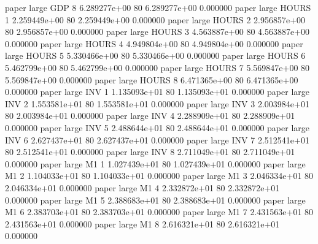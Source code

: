               paper      large      GDP                 8 6.289277e+00 80   6.289277e+00           0.000000
              paper      large    HOURS                 1 2.259449e+00 80   2.259449e+00           0.000000
              paper      large    HOURS                 2 2.956857e+00 80   2.956857e+00           0.000000
              paper      large    HOURS                 3 4.563887e+00 80   4.563887e+00           0.000000
              paper      large    HOURS                 4 4.949804e+00 80   4.949804e+00           0.000000
              paper      large    HOURS                 5 5.330466e+00 80   5.330466e+00           0.000000
              paper      large    HOURS                 6 5.462799e+00 80   5.462799e+00           0.000000
              paper      large    HOURS                 7 5.569847e+00 80   5.569847e+00           0.000000
              paper      large    HOURS                 8 6.471365e+00 80   6.471365e+00           0.000000
              paper      large      INV                 1 1.135093e+01 80   1.135093e+01           0.000000
              paper      large      INV                 2 1.553581e+01 80   1.553581e+01           0.000000
              paper      large      INV                 3 2.003984e+01 80   2.003984e+01           0.000000
              paper      large      INV                 4 2.288909e+01 80   2.288909e+01           0.000000
              paper      large      INV                 5 2.488644e+01 80   2.488644e+01           0.000000
              paper      large      INV                 6 2.627437e+01 80   2.627437e+01           0.000000
              paper      large      INV                 7 2.512541e+01 80   2.512541e+01           0.000000
              paper      large      INV                 8 2.711049e+01 80   2.711049e+01           0.000000
              paper      large       M1                 1 1.027439e+01 80   1.027439e+01           0.000000
              paper      large       M1                 2 1.104033e+01 80   1.104033e+01           0.000000
              paper      large       M1                 3 2.046334e+01 80   2.046334e+01           0.000000
              paper      large       M1                 4 2.332872e+01 80   2.332872e+01           0.000000
              paper      large       M1                 5 2.388683e+01 80   2.388683e+01           0.000000
              paper      large       M1                 6 2.383703e+01 80   2.383703e+01           0.000000
              paper      large       M1                 7 2.431563e+01 80   2.431563e+01           0.000000
              paper      large       M1                 8 2.616321e+01 80   2.616321e+01           0.000000

